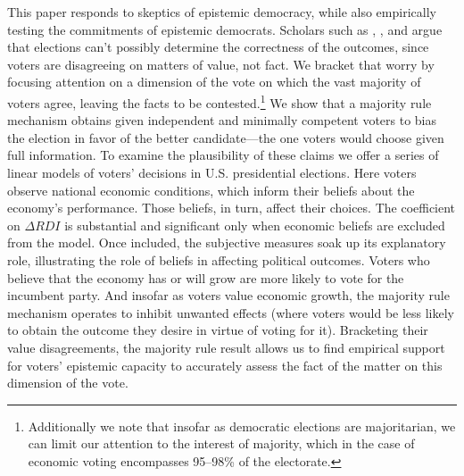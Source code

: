 \documentclass[11pt]{article}
\begin{document}
This paper responds to skeptics of epistemic democracy, while also empirically testing the commitments of epistemic democrats. Scholars such as \citet{Anderson2006}, \citet{Ingham2013}, and \cite{urbinati2014democracy} argue that elections can't possibly determine the correctness of the outcomes, since voters are disagreeing on matters of value, not fact. We bracket that worry by focusing attention on a dimension of the vote on which the vast majority of voters agree, leaving the facts to be contested.\footnote{Additionally we note that insofar as democratic elections are majoritarian, we can limit our attention to the interest of majority, which in the case of economic voting encompasses 95--98\% of the electorate.}
We show that a majority rule mechanism obtains given independent and minimally competent voters to bias the election in favor of the better candidate---the one voters would choose given full information.
To examine the plausibility of these claims we offer a series of linear models of voters' decisions in U.S. presidential elections. Here voters observe national economic conditions, which inform their beliefs about the economy's performance. Those beliefs, in turn, affect their choices. The coefficient on $\Delta RDI$  is substantial and significant only when economic beliefs are excluded from the model. Once included, the subjective measures soak up its explanatory role, illustrating the role of beliefs in affecting political outcomes. Voters who believe that the economy has or will grow are more likely to vote for the incumbent party. And insofar as voters value economic growth, the majority rule mechanism operates to inhibit unwanted effects (where voters would be less likely to obtain the outcome they desire in virtue of voting for it).
Bracketing their value disagreements, the majority rule result allows us to find empirical support for voters' epistemic capacity to accurately assess the fact of the matter on this dimension of the vote.

\end{document}
